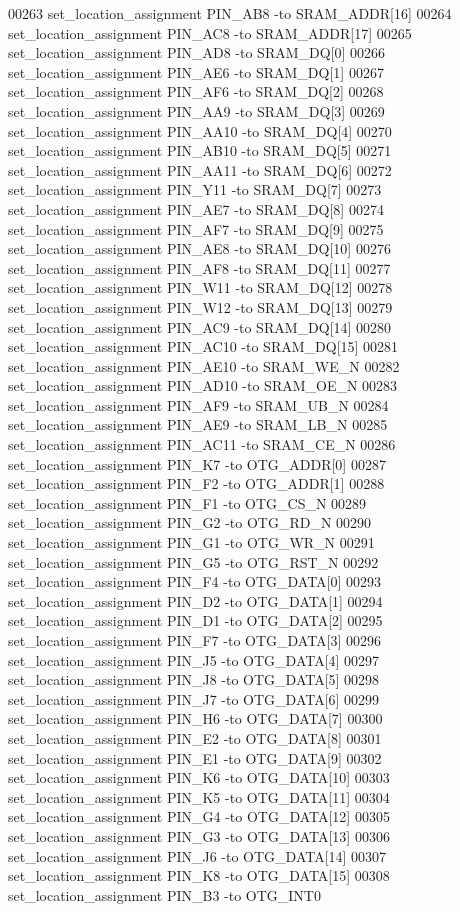 \begin{DoxyCode}
00263 set\_location\_assignment PIN\_AB8 -to SRAM\_ADDR[16]
00264 set\_location\_assignment PIN\_AC8 -to SRAM\_ADDR[17]
00265 set\_location\_assignment PIN\_AD8 -to SRAM\_DQ[0]
00266 set\_location\_assignment PIN\_AE6 -to SRAM\_DQ[1]
00267 set\_location\_assignment PIN\_AF6 -to SRAM\_DQ[2]
00268 set\_location\_assignment PIN\_AA9 -to SRAM\_DQ[3]
00269 set\_location\_assignment PIN\_AA10 -to SRAM\_DQ[4]
00270 set\_location\_assignment PIN\_AB10 -to SRAM\_DQ[5]
00271 set\_location\_assignment PIN\_AA11 -to SRAM\_DQ[6]
00272 set\_location\_assignment PIN\_Y11 -to SRAM\_DQ[7]
00273 set\_location\_assignment PIN\_AE7 -to SRAM\_DQ[8]
00274 set\_location\_assignment PIN\_AF7 -to SRAM\_DQ[9]
00275 set\_location\_assignment PIN\_AE8 -to SRAM\_DQ[10]
00276 set\_location\_assignment PIN\_AF8 -to SRAM\_DQ[11]
00277 set\_location\_assignment PIN\_W11 -to SRAM\_DQ[12]
00278 set\_location\_assignment PIN\_W12 -to SRAM\_DQ[13]
00279 set\_location\_assignment PIN\_AC9 -to SRAM\_DQ[14]
00280 set\_location\_assignment PIN\_AC10 -to SRAM\_DQ[15]
00281 set\_location\_assignment PIN\_AE10 -to SRAM\_WE\_N
00282 set\_location\_assignment PIN\_AD10 -to SRAM\_OE\_N
00283 set\_location\_assignment PIN\_AF9 -to SRAM\_UB\_N
00284 set\_location\_assignment PIN\_AE9 -to SRAM\_LB\_N
00285 set\_location\_assignment PIN\_AC11 -to SRAM\_CE\_N
00286 set\_location\_assignment PIN\_K7 -to OTG\_ADDR[0]
00287 set\_location\_assignment PIN\_F2 -to OTG\_ADDR[1]
00288 set\_location\_assignment PIN\_F1 -to OTG\_CS\_N
00289 set\_location\_assignment PIN\_G2 -to OTG\_RD\_N
00290 set\_location\_assignment PIN\_G1 -to OTG\_WR\_N
00291 set\_location\_assignment PIN\_G5 -to OTG\_RST\_N
00292 set\_location\_assignment PIN\_F4 -to OTG\_DATA[0]
00293 set\_location\_assignment PIN\_D2 -to OTG\_DATA[1]
00294 set\_location\_assignment PIN\_D1 -to OTG\_DATA[2]
00295 set\_location\_assignment PIN\_F7 -to OTG\_DATA[3]
00296 set\_location\_assignment PIN\_J5 -to OTG\_DATA[4]
00297 set\_location\_assignment PIN\_J8 -to OTG\_DATA[5]
00298 set\_location\_assignment PIN\_J7 -to OTG\_DATA[6]
00299 set\_location\_assignment PIN\_H6 -to OTG\_DATA[7]
00300 set\_location\_assignment PIN\_E2 -to OTG\_DATA[8]
00301 set\_location\_assignment PIN\_E1 -to OTG\_DATA[9]
00302 set\_location\_assignment PIN\_K6 -to OTG\_DATA[10]
00303 set\_location\_assignment PIN\_K5 -to OTG\_DATA[11]
00304 set\_location\_assignment PIN\_G4 -to OTG\_DATA[12]
00305 set\_location\_assignment PIN\_G3 -to OTG\_DATA[13]
00306 set\_location\_assignment PIN\_J6 -to OTG\_DATA[14]
00307 set\_location\_assignment PIN\_K8 -to OTG\_DATA[15]
00308 set\_location\_assignment PIN\_B3 -to OTG\_INT0

\end{DoxyCode}
